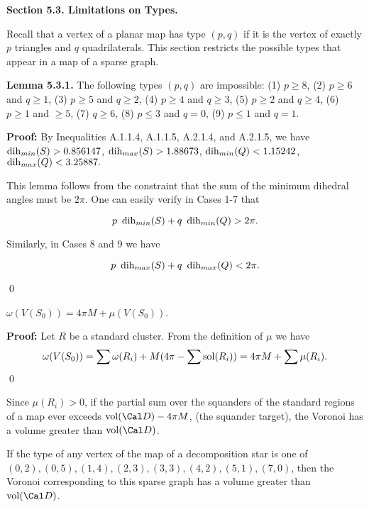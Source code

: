 \bigskip

{\bf Section 5.3. Limitations on Types.}

\bigskip

Recall that a vertex of a planar map has type $(p,q)$ if it is the vertex of exactly $p$ triangles and $q$ quadrilaterals.  This section restricts the possible types that appear in a map of a sparse graph.  


{\bf Lemma 5.3.1.} The following types $(p,q)$ are impossible: (1) $p\geq 8$, (2) $p\geq6$ and $q \geq 1$, (3) $p \geq 5$ and $q\geq 2$, (4) $p\geq 4$ and $q \geq 3$, (5) $p \geq 2$ and $q \geq 4$, (6) $p\ge 1$ and $\ge 5$, (7) $q \geq 6$, (8) $p \leq 3$ and $q=0$, (9) $p \leq 1$ and $q=1$. 

{\bf Proof:}  By Inequalities A.1.1.4, A.1.1.5, A.2.1.4, and  A.2.1.5,  we have\newline
$\operatorname{dih}_{min}(S)>0.856147$, \newline
$\operatorname{dih}_{max}(S)>1.88673$, \newline
$\operatorname{dih}_{min}(Q)<1.15242$, \newline
$\operatorname{dih}_{max}(Q)<3.25887.$ \newline

  This lemma follows from the constraint that the sum of the minimum dihedral angles must be $2 \pi$.  One can easily verify in Cases 1-7 that 

$$p\ \dih_{min}(S)  + q\ \dih_{min}(Q)  > 2 \pi.$$  

Similarly, in Cases 8 and 9 we have 

$$p\ \dih_{max}(S)  + q\ \dih_{max}(Q)  < 2 \pi.$$
 
\qed

 $\omega(V(S_0))=4 \pi M + \mu(V(S_0))$. \endproclaim

{\bf Proof:} Let $R$ be a standard cluster.  From the definition of $\mu$ we have $$\omega(V(S_0))=\sum \omega(R_i)+ M (4\pi - \sum \operatorname{sol}(R_i)) = 4 \pi M + \sum \mu(R_i).$$ \qed

Since $\mu(R_i) > 0$, if the partial sum over the squanders of the standard regions of a map ever exceeds $\vol(\Cal D)-4\pi M$, (the squander target), the Voronoi has a volume greater than $\vol(\Cal D)$.  

\bigskip

 If the type of any vertex of the map of a decomposition star is one of $(0,2), (0,5), (1,4), (2,3), (3,3), (4,2),(5,1), (7,0)$, then the Voronoi corresponding to this sparse graph has a volume greater than $\vol(\Cal D)$. \endproclaim

